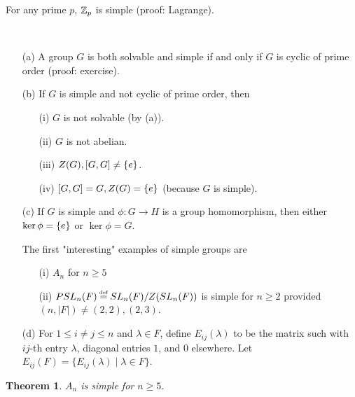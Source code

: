 \documentclass[11pt]{book}
\newcounter{counter}
\newtheorem{theorem}[counter]{Theorem}   \newtheorem*{theorem*}{Theorem}   \newtheorem{lemma}[counter]{Lemma}   \newtheorem{corollary}[counter]{Corollary}
\theoremstyle{definition}   \newtheorem{defn}[counter]{Definition} %
\newcommand\myeq{\mathrel{\overset{\makebox[0pt]{\mbox{\normalfont\tiny\sffamily \textrm{def}}}}{=}}}
\newcommand{\hm}{homomorphism}   \newcommand{\hms}{homomorphisms}   \newcommand{\iso}{isomorphism}
\DeclareMathOperator{\ra}{\rightarrow}   \DeclareMathOperator{\Poly}{\mathbf{P}}   \DeclareMathOperator{\spn}{\textnormal{span}}   \DeclareMathOperator{\aut}{\textnormal{Aut}}
\newcommand{\vs}{\vspace{8pt}}
\numberwithin{counter}{chapter}
\begin{document}
\vs

\begin{example}
For any prime $p$, $\operatorname{\mathbb{Z}}_p$ is simple (proof: Lagrange).
\end{example}

\vs

\begin{remark}\
\begin{enumerate}
\item[(a)] A group $G$ is both solvable and simple if and only if $G$ is cyclic of prime order (proof: exercise).
\item[(b)] If $G$ is simple and not cyclic of prime order, then
	\begin{enumerate}
	\item[(i)] $G$ is not solvable (by (a)).
	\item[(ii)] $G$ is not abelian.
	\item[(iii)] $Z(G), [G,G] \ne \{e\}$.
	\item[(iv)] $[G,G] = G, Z(G) = \{e\}$ (because $G$ is simple).
	\end{enumerate}
\item[(c)] If $G$ is simple and $\phi : G \ra H$ is a group \hm, then either $\ker \phi = \{e\}$ or $\ker \phi = G$.

The first "interesting" examples of simple groups are
	\begin{enumerate}
	\item[(i)] $A_n$ for $n \geq 5$
	\item[(ii)] $PSL_n(F) \myeq SL_n(F)/Z(SL_n(F))$ is simple for $n \geq 2$ provided $(n,|F|) \ne (2,2),(2,3)$.
	\end{enumerate}
\item[(d)] For $1 \leq i \ne j \leq n$ and $\lambda \in F$, define $E_{ij}(\lambda)$ to be the matrix such with $ij$-th entry $\lambda$, diagonal entries $1$, and $0$ elsewhere. Let $E_{ij}(F) = \{E_{ij}(\lambda) \mid \lambda \in F\}$.
\end{enumerate}
\end{remark}

\vs

\begin{theorem}
$A_n$ is simple for $n \geq 5$.
\end{theorem}
\end{document}
